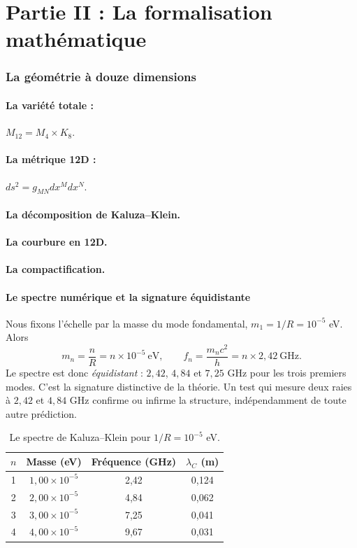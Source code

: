 \part*{Partie II : La formalisation mathématique}

\section{La géométrie à douze dimensions}
\subsection{La variété totale :} $M_{12} = M_4 \times K_8$.
\subsection{La métrique 12D :} $ds^2 = g_{MN} dx^M dx^N$.
\subsection{La décomposition de Kaluza--Klein.}
\subsection{La courbure en 12D.}
\subsection{La compactification.}

\subsection{Le spectre numérique et la signature équidistante}
Nous fixons l'échelle par la masse du mode fondamental, $m_1 = 1/R = 10^{-5}$ eV. Alors
\begin{equation}
m_n = \frac{n}{R} = n \times 10^{-5}\ \text{eV},
\qquad
f_n = \frac{m_n c^2}{h} = n \times 2,42\ \text{GHz}.
\end{equation}
Le spectre est donc \emph{équidistant} : $2,42$, $4,84$ et $7,25$ GHz pour les trois premiers modes. C'est la signature distinctive de la théorie. Un test qui mesure deux raies à $2,42$ et $4,84$ GHz confirme ou infirme la structure, indépendamment de toute autre prédiction.

\begin{table}[H]
\centering
\begin{tabular}{@{}cccc@{}}
\toprule
$n$ & Masse (eV) & Fréquence (GHz) & $\lambda_C$ (m) \\ \midrule
1 & $1,00\times10^{-5}$ & 2,42 & 0,124 \\
2 & $2,00\times10^{-5}$ & 4,84 & 0,062 \\
3 & $3,00\times10^{-5}$ & 7,25 & 0,041 \\
4 & $4,00\times10^{-5}$ & 9,67 & 0,031 \\ \bottomrule
\end{tabular}
\caption{Le spectre de Kaluza--Klein pour $1/R = 10^{-5}$ eV.}
\label{tab:spectru}
\end{table}

